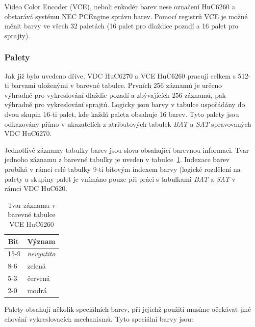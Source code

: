 Video Color Encoder (VCE), neboli enkodér barev nese označení HuC6260 a
obstarává systému NEC PCEngine správu barev. Pomocí registrů VCE je možné měnit
barvy ve všech 32 paletách (16 palet pro dlaždice pozadí a 16 palet pro
sprajty).


\subsubsection{Palety}\label{chap:spec_hw_vce_palette}

Jak již bylo uvedeno dříve, VDC HuC6270 a VCE HuC6260 pracují celkem s 512-ti
barvami uloženými v barevné tabulce. Prvních 256 záznamů je určeno výhradně pro
vykreslování dlaždic pozadí a zbývajících 256 záznamů, pak výhradně pro
vykreslování sprajtů. Logicky jsou barvy v tabulce uspořádány do dvou skupin
16-ti palet, kde každá paleta obsahuje 16 barev. Tyto palety jsou odkazovány
přímo v ukazatelích z atributových tabulek {\it BAT} a {\it SAT} spravovaných
VDC HuC6270.

Jednotlivé záznamy tabulky barev jsou slova obsahující barevnou informaci.
Tvar jednoho záznamu z barevné tabulky je uveden v tabulce~\ref{tab:vce_color}.
Indexace barev probíhá v rámci celé tabulky 9-ti bitovým indexem barvy (logické
rozdělení na palety a skupiny palet je vnímáno pouze při práci s tabulkami {\it 
BAT} a {\it SAT} v rámci VDC HuC620.

\begin{table}[ht]
\begin{center}
\begin{tabular}{|l|l|}
\hline
\textbf{Bit} & \textbf{Význam} \\
\hline
15-9 & {\em nevyužito} \\
8-6 & zelená \\
5-3 & červená \\
2-0 & modrá \\
\hline
\end{tabular}
\end{center}
\caption{Tvar záznamu v barevné tabulce VCE
	HuC6260\label{tab:vce_color}}
\end{table}

Palety obsahují několik speciálních barev, při jejichž použití musíme očekávat
jiné chování vykreslovacích mechanismů. Tyto speciální barvy jsou:

